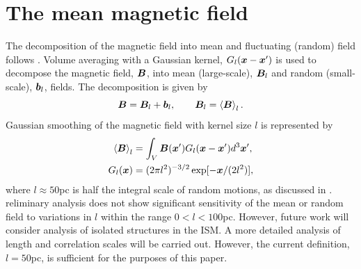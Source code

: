 \documentclass[useAMS,usenatbib]{mn2e}
\begin{document}
\section{The mean magnetic field}

The decomposition of the magnetic field into mean and fluctuating (random) 
field follows \MHD.
Volume averaging with a Gaussian kernel, $G_{l}(\boldsymbol{x}-\boldsymbol{x}')$ is used to decompose the magnetic field, $\boldsymbol{B}$, into mean (large-scale), $\boldsymbol{B}_{l}$ and random (small-scale), $\boldsymbol{b}_{l}$, fields. The decomposition is given by 
\begin{equation}
\boldsymbol{B} = \boldsymbol{B}_{l}+\boldsymbol{b}_{l},\qquad \boldsymbol{B}_{l} = \left<\boldsymbol{B}\right>_{l}. \label{decomp} 
\end{equation}
Gaussian smoothing of the magnetic field with kernel size $l$ is represented by
\begin{align}
\left<\boldsymbol{B}\right>_{l}&=\int_{V}\boldsymbol{B}(\boldsymbol{x}')G_{l}(\boldsymbol{x}-\boldsymbol{x}')d^{3}\boldsymbol{x}',\\
G_{l}(\boldsymbol{x})&=(2\pi l^2)^{-3/2}\exp[-\boldsymbol{x}/(2l^2)],\nonumber
\label{gauss}
\end{align} 
where $l\approx50$pc is half the integral scale of random motions, as discussed
in \HD.  
reliminary analysis does not show significant sensitivity of the mean or random field to variations in $l$ within the range $0<l<100$pc. However, future work will consider analysis of isolated structures in the ISM. A more detailed analysis of length and correlation scales will be carried out. However, the current definition, $l=50$pc, is sufficient for the purposes of this paper. 
\end{document}

